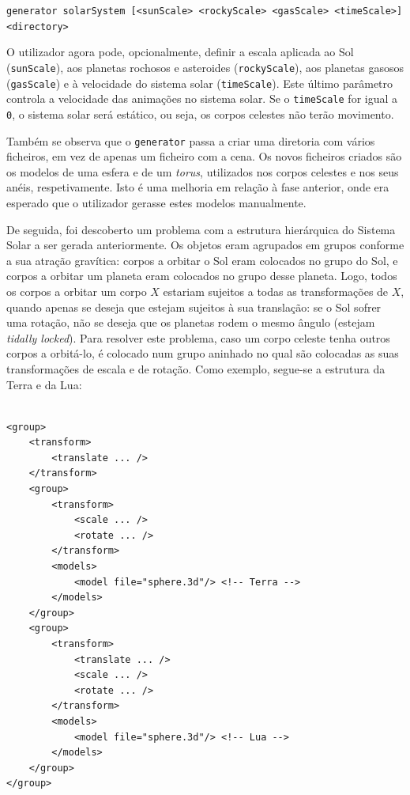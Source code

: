 \documentclass[12pt, a4paper]{article}
\begin{document}
\begin{center}
\texttt{generator solarSystem [<sunScale> <rockyScale> <gasScale> <timeScale>] <directory>}
\end{center}

O utilizador agora pode, opcionalmente, definir a escala aplicada ao Sol (\texttt{sunScale}), aos
planetas rochosos e asteroides (\texttt{rockyScale}), aos planetas gasosos (\texttt{gasScale}) e à
velocidade do sistema solar (\texttt{timeScale}). Este último parâmetro controla a velocidade
das animações no sistema solar. Se o \texttt{timeScale} for igual a \texttt{0}, o sistema solar será
estático, ou seja, os corpos celestes não terão movimento.

Também se observa que o \texttt{generator} passa a criar uma diretoria com vários ficheiros, em vez
de apenas um ficheiro com a cena. Os novos ficheiros criados são os modelos de uma esfera e de um
\emph{torus}, utilizados nos corpos celestes e nos seus anéis, respetivamente. Isto é uma melhoria
em relação à fase anterior, onde era esperado que o utilizador gerasse estes modelos manualmente.

De seguida, foi descoberto um problema com a estrutura hierárquica do Sistema Solar a ser gerada
anteriormente. Os objetos eram agrupados em grupos conforme a sua atração gravítica: corpos a
orbitar o Sol eram colocados no grupo do Sol, e corpos a orbitar um planeta eram colocados no grupo
desse planeta. Logo, todos os corpos a orbitar um corpo $X$ estariam sujeitos a todas as
transformações de $X$, quando apenas se deseja que estejam sujeitos à sua translação: se o Sol
sofrer uma rotação, não se deseja que os planetas rodem o mesmo ângulo (estejam
\emph{tidally locked}). Para resolver este problema, caso um corpo celeste tenha outros corpos a
orbitá-lo, é colocado num grupo aninhado no qual são colocadas as suas transformações de escala e de
rotação. Como exemplo, segue-se a estrutura da Terra e da Lua:

\lstset{language=xml}
\begin{lstlisting}

<group>
    <transform>
        <translate ... />
    </transform>
    <group>
        <transform>
            <scale ... />
            <rotate ... />
        </transform>
        <models>
            <model file="sphere.3d"/> <!-- Terra -->
        </models>
    </group>
    <group>
        <transform>
            <translate ... />
            <scale ... />
            <rotate ... />
        </transform>
        <models>
            <model file="sphere.3d"/> <!-- Lua -->
        </models>
    </group>
</group>
\end{lstlisting}
\end{document}
